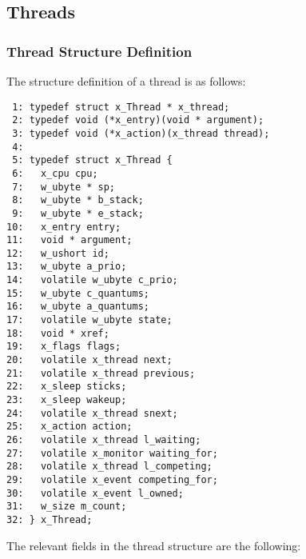 %
%

\subsection{Threads}

\subsubsection{Thread Structure Definition}

The structure definition of a thread is as follows:

\bcode
\begin{verbatim}
 1: typedef struct x_Thread * x_thread;
 2: typedef void (*x_entry)(void * argument);
 3: typedef void (*x_action)(x_thread thread);
 4:
 5: typedef struct x_Thread {
 6:   x_cpu cpu;
 7:   w_ubyte * sp;
 8:   w_ubyte * b_stack;
 9:   w_ubyte * e_stack;
10:   x_entry entry;
11:   void * argument;
12:   w_ushort id;
13:   w_ubyte a_prio;
14:   volatile w_ubyte c_prio;
15:   w_ubyte c_quantums;
16:   w_ubyte a_quantums;
17:   volatile w_ubyte state;
18:   void * xref;
19:   x_flags flags;
20:   volatile x_thread next;
21:   volatile x_thread previous;
22:   x_sleep sticks;
23:   x_sleep wakeup;
24:   volatile x_thread snext;
25:   x_action action;
26:   volatile x_thread l_waiting;
27:   volatile x_monitor waiting_for;
28:   volatile x_thread l_competing;
29:   volatile x_event competing_for;
30:   volatile x_event l_owned;
31:   w_size m_count;
32: } x_Thread;
\end{verbatim}
\ecode

The relevant fields in the thread structure are the following:

